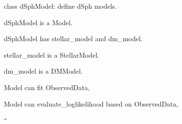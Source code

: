 \begin{DoxyItemize}
\begin{DoxyItemize}
\end{DoxyItemize}
\item class {\ttfamily d\+Sph\+Model}\+: define d\+Sph models.
\begin{DoxyItemize}
\item {\ttfamily d\+Sph\+Model} is a {\ttfamily Model}.
\item {\ttfamily d\+Sph\+Model} has {\ttfamily stellar\+\_\+model} and {\ttfamily dm\+\_\+model}.
\begin{DoxyItemize}
\item {\ttfamily stellar\+\_\+model} is a {\ttfamily Stellar\+Model}.
\item {\ttfamily dm\+\_\+model} is a {\ttfamily D\+M\+Model}.
\end{DoxyItemize}
\item {\ttfamily Model} can {\ttfamily fit} {\ttfamily Observed\+Data},
\item {\ttfamily Model} can {\ttfamily evaluate\+\_\+loglikelihood} based on {\ttfamily Observed\+Data},
\end{DoxyItemize}
\item ``
\item 
\item 
\end{DoxyItemize}

\section*{}